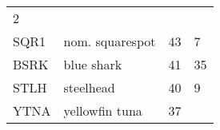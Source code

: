 \documentclass[]{article}
\begin{document}
\begin{longtable}[c]{@{}llll@{}}
\begin{minipage}[t]{0.23\columnwidth}
2
\end{minipage}
\\\addlinespace
\begin{minipage}[t]{0.08\columnwidth}\raggedright
SQR1
\end{minipage} & \begin{minipage}[t]{0.36\columnwidth}\raggedright
nom. squarespot
\end{minipage} & \begin{minipage}[t]{0.21\columnwidth}\raggedright
43
\end{minipage} & \begin{minipage}[t]{0.23\columnwidth}\raggedright
7
\end{minipage}
\\\addlinespace
\begin{minipage}[t]{0.08\columnwidth}\raggedright
BSRK
\end{minipage} & \begin{minipage}[t]{0.36\columnwidth}\raggedright
blue shark
\end{minipage} & \begin{minipage}[t]{0.21\columnwidth}\raggedright
41
\end{minipage} & \begin{minipage}[t]{0.23\columnwidth}\raggedright
35
\end{minipage}
\\\addlinespace
\begin{minipage}[t]{0.08\columnwidth}\raggedright
STLH
\end{minipage} & \begin{minipage}[t]{0.36\columnwidth}\raggedright
steelhead
\end{minipage} & \begin{minipage}[t]{0.21\columnwidth}\raggedright
40
\end{minipage} & \begin{minipage}[t]{0.23\columnwidth}\raggedright
9
\end{minipage}
\\\addlinespace
\begin{minipage}[t]{0.08\columnwidth}\raggedright
YTNA
\end{minipage} & \begin{minipage}[t]{0.36\columnwidth}\raggedright
yellowfin tuna
\end{minipage} & \begin{minipage}[t]{0.21\columnwidth}\raggedright
37
\end{minipage} & \begin{minipage}[t]{0.23\columnwidth}\raggedright

\end{minipage}
\end{longtable}
\end{document}
